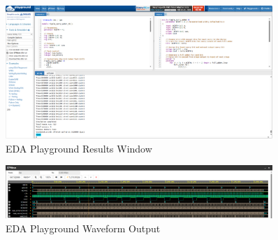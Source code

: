 \documentclass[fleqn]{article}
\begin{document}
\begin{enumerate}
		 \begin{figure}[H]
		 	\centerline{\includegraphics[width=0.9\textwidth]{eda_playground_results_window.png}}
			\caption{EDA Playground Results Window}
			\label{fig::eda_playground_results_window}
		 \end{figure}
		 
		 \begin{figure}[H]
		 	\centerline{\includegraphics[width=0.9\textwidth]{eda_playground_waveform.png}}
			\caption{EDA Playground Waveform Output}
			\label{fig::eda_playground_waveform}
		 \end{figure}
		 

	\end{enumerate}
	
\end{document}
